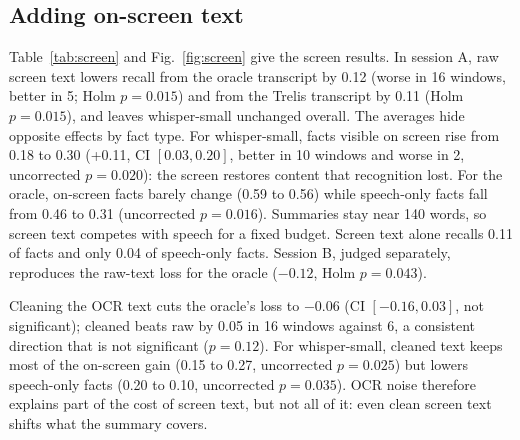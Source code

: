\documentclass[conference]{IEEEtran}
\begin{document}
\subsection{Adding on-screen text}\label{sec:screenres}
Table~\ref{tab:screen} and Fig.~\ref{fig:screen} give the screen results. In session A, raw screen text lowers recall from the oracle transcript by 0.12 (worse in 16 windows, better in 5; Holm $p = 0.015$) and from the Trelis transcript by 0.11 (Holm $p = 0.015$), and leaves whisper-small unchanged overall. The averages hide opposite effects by fact type. For whisper-small, facts visible on screen rise from 0.18 to 0.30 (+0.11, CI $[0.03, 0.20]$, better in 10 windows and worse in 2, uncorrected $p = 0.020$): the screen restores content that recognition lost. For the oracle, on-screen facts barely change (0.59 to 0.56) while speech-only facts fall from 0.46 to 0.31 (uncorrected $p = 0.016$). Summaries stay near 140 words, so screen text competes with speech for a fixed budget. Screen text alone recalls 0.11 of facts and only 0.04 of speech-only facts. Session B, judged separately, reproduces the raw-text loss for the oracle ($-0.12$, Holm $p = 0.043$).

Cleaning the OCR text cuts the oracle's loss to $-0.06$ (CI $[-0.16, 0.03]$, not significant); cleaned beats raw by 0.05 in 16 windows against 6, a consistent direction that is not significant ($p = 0.12$). For whisper-small, cleaned text keeps most of the on-screen gain (0.15 to 0.27, uncorrected $p = 0.025$) but lowers speech-only facts (0.20 to 0.10, uncorrected $p = 0.035$). OCR noise therefore explains part of the cost of screen text, but not all of it: even clean screen text shifts what the summary covers.
\end{document}
